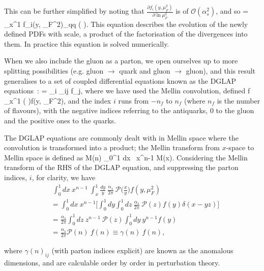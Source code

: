 \ee
This can be further simplified by noting that $\frac{\partial f_i(y,\mu_F^2)}{\partial \ln \mu_F^2}$ is of $\mathcal{O}(\alpha_s^2)$, and so
\be
{}  =   \int_x^1  f_i(y, \mu_F^2)_{qq} \bigg(  \bigg).
\ee
This equation describes the evolution of the newly defined PDFs with scale, a product of the factorisation of the divergences into them. In practice this equation is solved numerically. 

When we also include the gluon as a parton, we open ourselves up to more splitting possibilities (e.g. gluon $\to$ quark and gluon $\to$ gluon), and this result generalises to a set of coupled differential equations known as the DGLAP equations~\cite{jr:altarelli, jr:dokshitzer,jr:gribov}:
\be 
\label{eqn:DGLAP}
 = \sum_i  _{ij} \otimes f_j,
\ee
where we have used the Mellin convolution, defined
\be 
{} \otimes f \equiv \int_x^1   \bigg(  \bigg)f(y, \mu_F^2),
\ee
and the index $i$ runs from $-n_f$ to $n_f$ (where $n_f$ is the number of flavours), with the negative indices referring to the antiquarks, 0 to the gluon and the positive ones to the quarks.

The DGLAP equations are commonly dealt with in Mellin space where the convolution is transformed into a product; the Mellin transform from $x$-space to Mellin space is defined as
\be
M(n) \equiv \int_0^1 dx \ x^{n-1} M(x).
\ee
Considering the Mellin transform of the RHS of the DGLAP equation, and suppressing the parton indices, $i$, for clarity,  we have
\begin{equation}
\begin{split}
 &\ \int_0^1 dx\ x^{n-1} \ \int_x^1 \frac{dy}{y}\ \frac{\alpha_s}{2 \pi}\ \mathcal{P} \bigg( \frac{x}{y} \bigg)f(y, \mu_F^2) \\
&= \int_0^1 dx\ x^{n-1}  \bigg[ \int_0^1 dy \int_0^1 dz\ \frac{\alpha_s}{2 \pi}\ \mathcal{P}(z) f(y) \delta(x-yz) \bigg] \\
&= \frac{\alpha_s}{2 \pi} \int_0^1 dz\ z^{n-1}\ \mathcal{P}(z)\int_0^1 dy\ y^{n-1} f(y) \\
&= \frac{\alpha_s}{2 \pi} \mathcal{P}(n)\ f(n) \equiv \gamma(n)\ f(n),
\end{split}
\end{equation}

where $\gamma(n)_{ij}$ (with parton indices explicit) are known as the anomalous dimensions, and are calculable order by order in perturbation theory. 
